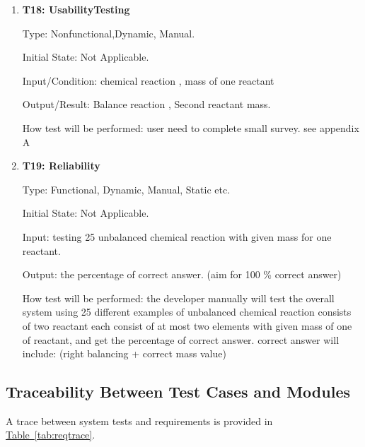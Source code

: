 \documentclass[12pt, titlepage]{article}
\begin{document}
\begin{enumerate}

\item{ \bf T18: UsabilityTesting\\}

Type:  Nonfunctional,Dynamic, Manual.
					
Initial State:  Not Applicable.
					
Input/Condition: chemical reaction ,  mass of one reactant
					
Output/Result: Balance reaction , Second reactant mass.
					
How test will be performed: user need to complete small survey. see appendix A 
					
\item{\bf T19: Reliability\\}

Type: Functional, Dynamic, Manual, Static etc.
					
Initial State:  Not Applicable.
					
Input: testing 25 unbalanced chemical reaction with given mass for one reactant.
					
Output: the percentage of correct answer. (aim for 100 \% correct answer) 
					
How test will be performed: the developer manually will test the overall system using 25 different examples of unbalanced chemical reaction consists of two reactant each consist of at most two elements with given mass of one of reactant, and get the percentage of correct answer. correct answer will include: (right balancing + correct mass value) 

\end{enumerate}
		

\subsection{Traceability Between Test Cases and Modules}

A trace between system tests and requirements is provided in 
\hyperref[tab:reqtrace]{Table~\ref*{tab:reqtrace}}.

\begin{table}[h!]
\centering
{}
\caption{Traceability Matrix Showing the Connections Between Modules and Test Cases}
\label{tab:reqtrace}
\end{table}
\end{document}
